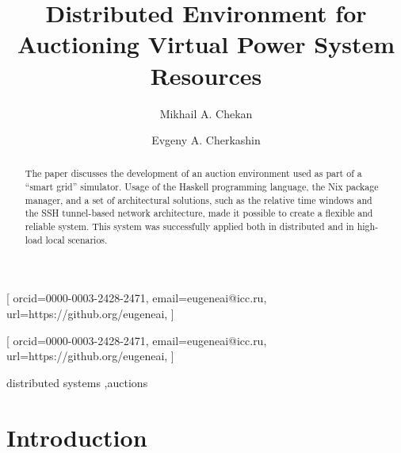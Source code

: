 \documentclass[
]{ceurart}
\begin{document}


\title{Distributed Environment for Auctioning Virtual Power System Resources}
\author[1,2]{Mikhail A. Chekan}[%
orcid=0000-0003-2428-2471,
email=eugeneai@icc.ru,
url=https://github.org/eugeneai,
]
\author[1,2]{Evgeny A. Cherkashin}[%
orcid=0000-0003-2428-2471,
email=eugeneai@icc.ru,
url=https://github.org/eugeneai,
]
\address[1]{Matrosov Institute for System Dynamics and Control Theory of Siberian Branch of Russian Academy of Sciences, 134 Lermontov St, Irkutsk, 664033, Russian Federation}

\address[2]{Institute for Mathematics and Information Technologies, Irkutsk State University, 20~Gagarina Bulv, Irkutsk, 664003, Russian Federation}


\begin{abstract}
  The paper discusses the development of an auction environment used as part of a ``smart grid'' simulator. Usage of the Haskell programming language, the Nix package manager, and a set of architectural solutions, such as the relative time windows and the SSH tunnel-based network architecture, made it possible to create a flexible and reliable system. This system was successfully applied both in distributed and in high-load local scenarios.
\end{abstract}

\begin{keywords}
  distributed systems \sep auctions
\end{keywords}

\maketitle

\section*{Introduction}
\label{sec:into}
\end{document}
